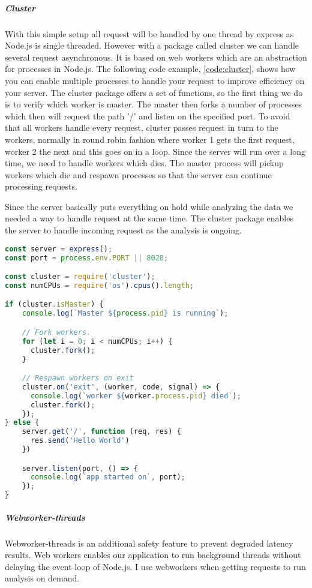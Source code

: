 \documentclass[USenglish]{ifimaster}  %
\begin{document}
\subparagraph{Cluster}
With this simple setup all request will be handled by one thread by express as Node.js is single threaded. However with a package called cluster we can handle several request asynchronous. It is based on web workers which are an abstraction for processes in Node.js.
The following code example, \vref{code:cluster}, shows how you can enable multiple processes to handle your request to improve efficiency on your server. The cluster package offers a set of functions, so the first thing we do is to verify which worker is master. The master then forks a number of processes which then will request the path '/' and listen on the specified port. To avoid that all workers handle every request, cluster passes request in turn to the workers, normally in round robin fashion where worker 1 gets the first request, worker 2 the next and this goes on in a loop. Since the server will run over a long time, we need to handle workers which dies. The master process will pickup workers which die and respawn processes so that the server can continue processing requests.

Since the server basically puts everything on hold while analyzing the data we needed a way to handle request at the same time. The cluster package enables the server to handle incoming request as the analysis is ongoing.

\begin{lstlisting}[caption={Express setup with cluster},label={code:cluster},language=JavaScript]
const server = express();
const port = process.env.PORT || 8020;

const cluster = require('cluster');
const numCPUs = require('os').cpus().length;

if (cluster.isMaster) {
    console.log(`Master ${process.pid} is running`);

    // Fork workers.
    for (let i = 0; i < numCPUs; i++) {
      cluster.fork();
    }

    // Respawn workers on exit
    cluster.on('exit', (worker, code, signal) => {
      console.log(`worker ${worker.process.pid} died`);
      cluster.fork();
    });
} else {
    server.get('/', function (req, res) {
      res.send('Hello World')
    })

    server.listen(port, () => {
      console.log(`app started on`, port);
    });
}
\end{lstlisting}

\subparagraph{Webworker-threads}
Webworker-threads is an additional safety feature to prevent degraded latency results. Web workers enables our application to run background threads without delaying the event loop of Node.js. I use webworkers when getting requests to run analysis on demand.
\end{document}
